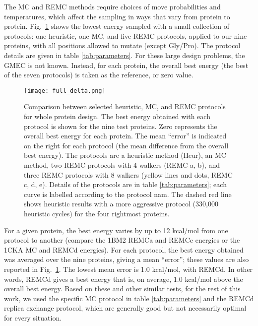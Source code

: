The MC and REMC methods require choices of move probabilities and temperatures, which affect the sampling in ways that vary from protein to protein. Fig.\ \ref{fig:fulldelta} shows the lowest energy sampled with a small collection of protocols: one heuristic, one MC, and five REMC protocols, applied to our nine proteins, with all positions allowed to mutate (except Gly/Pro). The protocol details are given in table \ref{tab:parameters}. For these large design problems, the GMEC is not known. Instead, for each protein, the overall best energy (the best of the seven protocols) is taken as the reference, or zero value.


    \begin{figure}[!htbp]
      \centering
        \texttt{[image: full\_delta.png]} 
      \caption{
Comparison between selected heuristic, MC, and REMC protocols for whole protein design. The best energy obtained with each protocol is shown for the nine test proteins. Zero represents the overall best energy for each protein. The mean ``error'' is indicated on the right for each protocol (the mean difference from the overall best energy). The protocols are a heuristic method (Heur), an MC method, two REMC protocols with 4 walkers (REMC a, b), and three REMC protocols with 8 walkers (yellow lines and dots, REMC c, d, e). Details of the protocols are in table \ref{tab:parameters}; each curve is labelled according to the protocol nam. The dashed red line shows heuristic results with a more aggressive protocol (330,000 heuristic cycles) for the four rightmost proteins.
}
       \label{fig:fulldelta}
    \end{figure}

For a given protein, the best energy varies by up to 12 kcal/mol from one protocol to another (compare the 1BM2 REMCa and REMCc energies or the 1CKA MC and REMCd energies). For each protocol, the best energy obtained was averaged over the nine proteins, giving a mean ``error''; these values are also reported in Fig.\ \ref{fig:fulldelta}. The lowest mean error is 1.0 kcal/mol, with REMCd. In other words, REMCd gives a best energy that is, on average, 1.0 kcal/mol above the overall best energy. Based on these and other similar tests, for the rest of this work, we used the specific MC protocol in table \ref{tab:parameters} and the REMCd replica exchange protocol, which are generally good but not necessarily optimal for every situation. 

